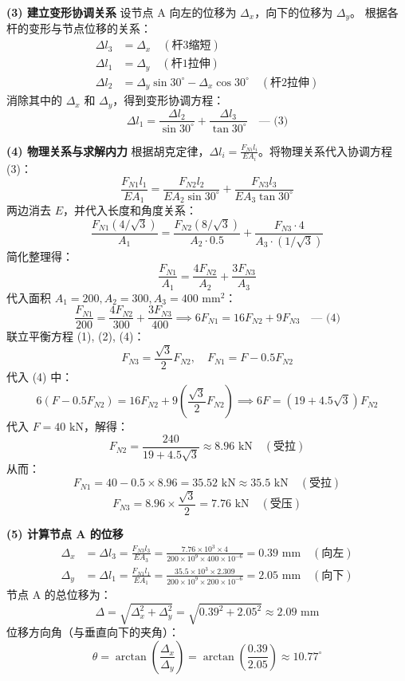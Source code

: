 \documentclass[11pt,a4paper]{ctexrep}
\begin{document}
{\begin{enumerate}
\textbf{(3) 建立变形协调关系}
设节点 A 向左的位移为 $\Delta_x$，向下的位移为 $\Delta_y$。
根据各杆的变形与节点位移的关系：
\begin{align*}
\Delta l_3 &= \Delta_x \quad (\text{杆3缩短}) \\
\Delta l_1 &= \Delta_y \quad (\text{杆1拉伸}) \\
\Delta l_2 &= \Delta_y\sin 30^\circ - \Delta_x\cos 30^\circ \quad (\text{杆2拉伸})
\end{align*}
消除其中的 $\Delta_x$ 和 $\Delta_y$，得到变形协调方程：
\[
\Delta l_1 = \frac{\Delta l_2}{\sin 30^\circ} + \frac{\Delta l_3}{\tan 30^\circ} \quad \text{--- (3)}
\]

\textbf{(4) 物理关系与求解内力}
根据胡克定律，$\Delta l_i = \frac{F_{Ni} l_i}{E A_i}$。将物理关系代入协调方程 (3)：
\[
\frac{F_{N1} l_1}{E A_1} = \frac{F_{N2} l_2}{E A_2 \sin 30^\circ} + \frac{F_{N3} l_3}{E A_3 \tan 30^\circ}
\]
两边消去 $E$，并代入长度和角度关系：
\[
\frac{F_{N1} (4/\sqrt{3})}{A_1} = \frac{F_{N2} (8/\sqrt{3})}{A_2 \cdot 0.5} + \frac{F_{N3} \cdot 4}{A_3 \cdot (1/\sqrt{3})}
\]
简化整理得：
\[
\frac{F_{N1}}{A_1} = \frac{4F_{N2}}{A_2} + \frac{3F_{N3}}{A_3}
\]
代入面积 $A_1=200, A_2=300, A_3=400\text{ mm}^2$：
\[
\frac{F_{N1}}{200} = \frac{4F_{N2}}{300} + \frac{3F_{N3}}{400} \implies 6F_{N1} = 16F_{N2} + 9F_{N3} \quad \text{--- (4)}
\]
联立平衡方程 (1), (2), (4)：
\[
F_{N3} = \frac{\sqrt{3}}{2} F_{N2},\quad F_{N1} = F - 0.5F_{N2}
\]
代入 (4) 中：
\[
6(F - 0.5F_{N2}) = 16F_{N2} + 9\left(\frac{\sqrt{3}}{2} F_{N2}\right) \implies 6F = \left(19 + 4.5\sqrt{3}\right) F_{N2}
\]
代入 $F = 40\text{ kN}$，解得：
\[
F_{N2} = \frac{240}{19 + 4.5\sqrt{3}} \approx 8.96\text{ kN} \quad (\text{受拉})
\]
从而：
\[
F_{N1} = 40 - 0.5 \times 8.96 = 35.52\text{ kN} \approx 35.5\text{ kN} \quad (\text{受拉})
\]
\[
F_{N3} = 8.96 \times \frac{\sqrt{3}}{2} = 7.76\text{ kN} \quad (\text{受压})
\]

\textbf{(5) 计算节点 A 的位移}
\begin{align*}
\Delta_x &= \Delta l_3 = \frac{F_{N3} l_3}{E A_3} = \frac{7.76 \times 10^3 \times 4}{200 \times 10^9 \times 400 \times 10^{-6}} = 0.39\text{ mm} \quad (\text{向左}) \\
\Delta_y &= \Delta l_1 = \frac{F_{N1} l_1}{E A_1} = \frac{35.5 \times 10^3 \times 2.309}{200 \times 10^9 \times 200 \times 10^{-6}} = 2.05\text{ mm} \quad (\text{向下})
\end{align*}
节点 A 的总位移为：
\[
\Delta = \sqrt{\Delta_x^2 + \Delta_y^2} = \sqrt{0.39^2 + 2.05^2} \approx 2.09\text{ mm}
\]
位移方向角（与垂直向下的夹角）：
\[
\theta = \arctan\left(\frac{\Delta_x}{\Delta_y}\right) = \arctan\left(\frac{0.39}{2.05}\right) \approx 10.77^\circ
\]



\end{enumerate}}
\end{document}
